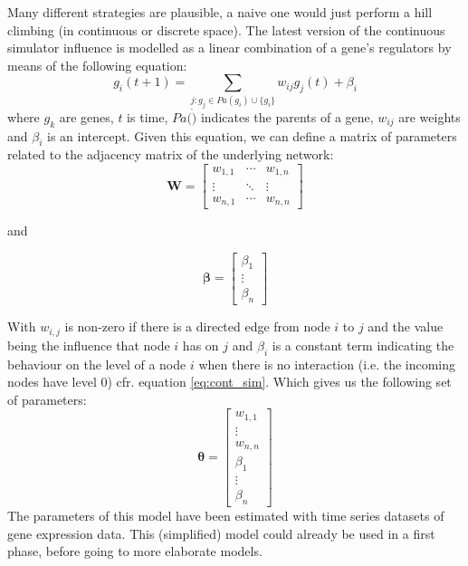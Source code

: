 \documentclass{article}
\begin{document}
Many different strategies are plausible, a naive one would just perform a hill climbing (in continuous or discrete space).
The latest version of the continuous simulator influence is modelled as a linear combination of a gene's regulators by means of the following equation:
\begin{equation}
 g_i(t+1) = \sum_{j : g_j \in Pa(g_i) \cup \{g_i\} } w_{ij}g_j(t) + \beta_{i}
 \label{eq:cont_sim}
\end{equation}
where $g_k$ are genes, $t$ is time, $Pa(\dot)$ indicates the parents of a gene, $w_{ij}$ are weights and $\beta_i$ is an intercept. 
Given this equation, we can define a matrix of parameters related to the adjacency matrix of the underlying network:
\begin{equation}
\mathbf{W} = \begin{bmatrix} 
w_{1,1} &\cdots & w_{1,n}\\
\vdots & \ddots & \vdots \\
w_{n,1} & \cdots & w_{n,n} 
      \end{bmatrix}
\end{equation}


and

\begin{equation}
 \mathbf{\beta} = \begin{bmatrix}
      \beta_1 \\
      \vdots \\
      \beta_n 
     \end{bmatrix}
\end{equation}

With $w_{i,j}$ is non-zero if there is a directed edge from node $i$ to $j$ and the value being the influence that node $i$ has on $j$ and $\beta_i$ is a constant term indicating the behaviour on the level of a node $i$ 
when there is no interaction (i.e. the incoming nodes have level 0) cfr. equation \ref{eq:cont_sim}. Which gives us the following set of parameters:
\begin{equation}
 \mathbf{\theta} = \begin{bmatrix}
                     w_{1,1} \\
                     \vdots \\
                     w_{n,n} \\
                     \beta_1 \\
                     \vdots \\
                     \beta_n
                    \end{bmatrix}
% 
\end{equation}
The parameters of this model have been estimated with time series datasets of gene expression data. This (simplified) model could already be used in a first phase, before going to more elaborate models.
\end{document}
